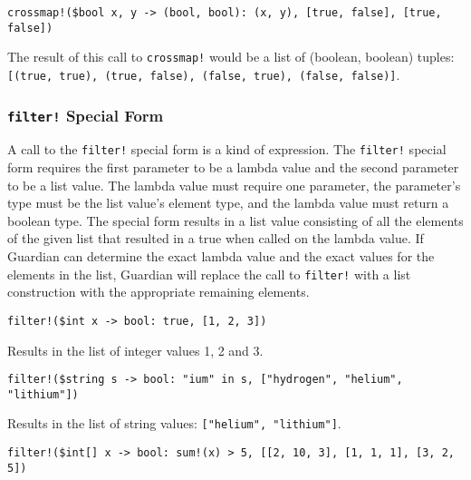 {{\begin{itemize}
{			\item[] \lstinline[language=MAIA, columns=fixed]@crossmap!($bool x, y -> (bool, bool): (x, y), [true, false], [true, false])@
			
				The result of this call to \lstinline[language=MAIA, columns=fixed]@crossmap!@ would be a list of
				(boolean, boolean)
				tuples: \lstinline[language=MAIA, columns=fixed]@[(true, true), (true, false), (false, true), (false, false)]@.
		}
		\end{itemize}
	}
	
	\subsubsection{\lstinline[language=MAIA, columns=fixed]@filter!@ Special Form}
	{
		A call to the \lstinline[language=MAIA, columns=fixed]@filter!@ special form is a kind of expression.
		The \lstinline[language=MAIA, columns=fixed]@filter!@ special form requires the first parameter to be
		a lambda value and the second parameter to be a list value.
		The lambda value must require one parameter, the parameter's type must
		be the list value's element type, and the lambda value must return a
		boolean type.
		The special form results in a list value consisting of all the elements
		of the given list that resulted in a true when called on the lambda
		value.
		If Guardian can determine the exact lambda value and the exact
		values for the elements in the list, Guardian will replace the call
		to \lstinline[language=MAIA, columns=fixed]@filter!@ with a list construction with the appropriate
		remaining elements.
		
		\begin{itemize}
		{
			\item[] \lstinline[language=MAIA, columns=fixed]@filter!($int x -> bool: true, [1, 2, 3])@
			
				Results in the list of integer values 1, 2 and 3.
			
			\item[] \lstinline[language=MAIA, columns=fixed]@filter!($string s -> bool: "ium" in s, ["hydrogen", "helium", "lithium"])@
			
				Results in the list of string
				values: \lstinline[language=MAIA, columns=fixed]@["helium", "lithium"]@.
			
			\item[] \lstinline[language=MAIA, columns=fixed]@filter!($int[] x -> bool: sum!(x) > 5, [[2, 10, 3], [1, 1, 1], [3, 2, 5])@
				
}
\end{itemize}}}
